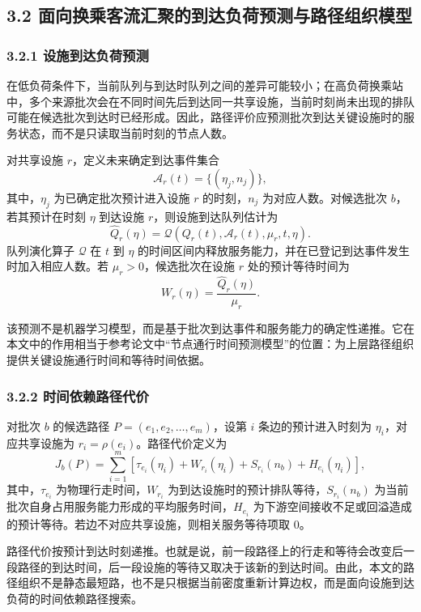 \documentclass[UTF8,a4paper,12pt]{ctexart}
\begin{document}
\subsection{3.2 面向换乘客流汇聚的到达负荷预测与路径组织模型}

\subsubsection{3.2.1 设施到达负荷预测}

在低负荷条件下，当前队列与到达时队列之间的差异可能较小；在高负荷换乘站中，多个来源批次会在不同时间先后到达同一共享设施，当前时刻尚未出现的排队可能在候选批次到达时已经形成。因此，路径评价应预测批次到达关键设施时的服务状态，而不是只读取当前时刻的节点人数。

对共享设施 \(r\)，定义未来确定到达事件集合
\[
\mathcal{A}_r(t)=\{(\eta_j,n_j)\},
\]
其中，\(\eta_j\) 为已确定批次预计进入设施 \(r\) 的时刻，\(n_j\) 为对应人数。对候选批次 \(b\)，若其预计在时刻 \(\eta\) 到达设施 \(r\)，则设施到达队列估计为
\[
\widehat Q_r(\eta)=\mathcal{Q}\left(Q_r(t),\mathcal{A}_r(t),\mu_r,t,\eta\right).
\]
队列演化算子 \(\mathcal{Q}\) 在 \(t\) 到 \(\eta\) 的时间区间内释放服务能力，并在已登记到达事件发生时加入相应人数。若 \(\mu_r>0\)，候选批次在设施 \(r\) 处的预计等待时间为
\[
W_r(\eta)=\frac{\widehat Q_r(\eta)}{\mu_r}.
\]

该预测不是机器学习模型，而是基于批次到达事件和服务能力的确定性递推。它在本文中的作用相当于参考论文中“节点通行时间预测模型”的位置：为上层路径组织提供关键设施通行时间和等待时间依据。

\subsubsection{3.2.2 时间依赖路径代价}

对批次 \(b\) 的候选路径 \(P=(e_1,e_2,\ldots,e_m)\)，设第 \(i\) 条边的预计进入时刻为 \(\eta_i\)，对应共享设施为 \(r_i=\rho(e_i)\)。路径代价定义为
\[
J_b(P)=\sum_{i=1}^{m}\left[\tau_{e_i}(\eta_i)+W_{r_i}(\eta_i)+S_{r_i}(n_b)+H_{e_i}(\eta_i)\right],
\]
其中，\(\tau_{e_i}\) 为物理行走时间，\(W_{r_i}\) 为到达设施时的预计排队等待，\(S_{r_i}(n_b)\) 为当前批次自身占用服务能力形成的平均服务时间，\(H_{e_i}\) 为下游空间接收不足或回溢造成的预计等待。若边不对应共享设施，则相关服务等待项取 0。

路径代价按预计到达时刻递推。也就是说，前一段路径上的行走和等待会改变后一段路径的到达时间，后一段设施的等待又取决于该新的到达时间。由此，本文的路径组织不是静态最短路，也不是只根据当前密度重新计算边权，而是面向设施到达负荷的时间依赖路径搜索。
\end{document}

